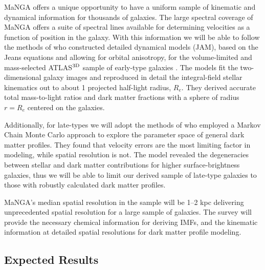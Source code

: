 \documentclass[11pt, a4paper, onecolumn]{article}
\begin{document}
\begin{multicols}{2}
    MaNGA offers a unique opportunity to have a uniform sample of kinematic and
    dynamical information for thousands of galaxies. The large spectral
    coverage of MaNGA offers a suite of spectral lines available for
    determining velocities as a function of position in the galaxy. With this
    information we will be able to follow the methods of \citet{cappellari13}
    who constructed detailed dynamical models (JAM), based on the Jeans
    equations and allowing for orbital anisotropy, for the volume-limited and
    mass-selected ATLAS$^{\rm 3D}$ sample of early-type galaxies
    \citep{cappellari11}. The models fit the two-dimensional galaxy images and
    reproduced in detail the integral-field stellar kinematics out to about 1
    projected half-light radius, $R_e$. They derived accurate total
    mass-to-light ratios and dark matter fractions with a sphere of radius $r =
    R_e$ centered on the galaxies.

    Additionally, for late-types we will adopt the methods of \citet{hague13}
    who employed a Markov Chain Monte Carlo approach to explore the parameter
    space of general dark matter profiles. They found that velocity errors are
    the most limiting factor in modeling, while spatial resolution is not. The
    model revealed the degeneracies between stellar and dark matter
    contributions for higher surface-brightness galaxies, thus we will be able
    to limit our derived sample of late-type galaxies to those with robustly
    calculated dark matter profiles. 
    
    MaNGA's median spatial resolution in the sample will be 1--2 kpc delivering
    unprecedented spatial resolution for a large sample of galaxies. The survey
    will provide the necessary chemical information for deriving IMFs, and the
    kinematic information at detailed spatial resolutions for dark matter
    profile modeling.

\subsection{Expected Results}


\end{multicols}
\end{document}
